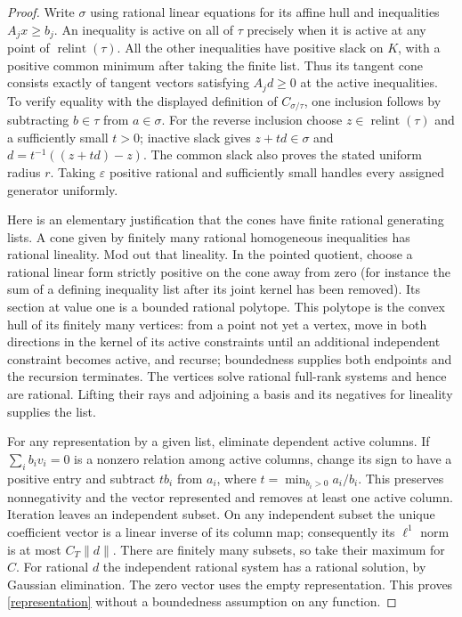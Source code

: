 \documentclass[11pt]{article}
\newcommand{\relint}{\operatorname{relint}}
\begin{document}
\begin{proof}
Write $\sigma$ using rational linear equations for its affine hull and inequalities $A_jx\geq b_j$. An inequality is active on all of $\tau$ precisely when it is active at any point of $\relint(\tau)$. All the other inequalities have positive slack on $K$, with a positive common minimum after taking the finite list. Thus its tangent cone consists exactly of tangent vectors satisfying $A_jd\geq0$ at the active inequalities. To verify equality with the displayed definition of $C_{\sigma/\tau}$, one inclusion follows by subtracting $b\in\tau$ from $a\in\sigma$. For the reverse inclusion choose $z\in\relint(\tau)$ and a sufficiently small $t>0$; inactive slack gives $z+td\in\sigma$ and $d=t^{-1}((z+td)-z)$. The common slack also proves the stated uniform radius $r$. Taking $\varepsilon$ positive rational and sufficiently small handles every assigned generator uniformly.

Here is an elementary justification that the cones have finite rational generating lists. A cone given by finitely many rational homogeneous inequalities has rational lineality. Mod out that lineality. In the pointed quotient, choose a rational linear form strictly positive on the cone away from zero (for instance the sum of a defining inequality list after its joint kernel has been removed). Its section at value one is a bounded rational polytope. This polytope is the convex hull of its finitely many vertices: from a point not yet a vertex, move in both directions in the kernel of its active constraints until an additional independent constraint becomes active, and recurse; boundedness supplies both endpoints and the recursion terminates. The vertices solve rational full-rank systems and hence are rational. Lifting their rays and adjoining a basis and its negatives for lineality supplies the list.

For any representation by a given list, eliminate dependent active columns. If $\sum_i b_i v_i=0$ is a nonzero relation among active columns, change its sign to have a positive entry and subtract $t b_i$ from $a_i$, where $t=\min_{b_i>0}a_i/b_i$. This preserves nonnegativity and the vector represented and removes at least one active column. Iteration leaves an independent subset. On any independent subset the unique coefficient vector is a linear inverse of its column map; consequently its $\ell^1$ norm is at most $C_T\|d\|$. There are finitely many subsets, so take their maximum for $C$. For rational $d$ the independent rational system has a rational solution, by Gaussian elimination. The zero vector uses the empty representation. This proves \eqref{representation} without a boundedness assumption on any function.
\end{proof}
\end{document}
